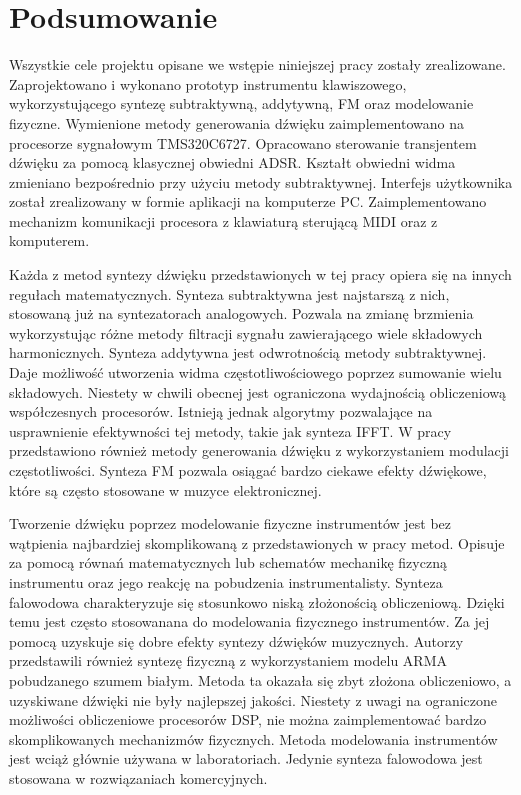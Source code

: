 \chapter{Podsumowanie}

Wszystkie cele projektu opisane we wstępie niniejszej pracy zostały zrealizowane. Zaprojektowano i wykonano prototyp instrumentu klawiszowego, wykorzystującego syntezę subtraktywną, addytywną, FM oraz modelowanie fizyczne. Wymienione metody generowania dźwięku zaimplementowano na procesorze sygnałowym TMS320C6727. Opracowano sterowanie transjentem dźwięku za pomocą klasycznej obwiedni ADSR. Kształt obwiedni widma zmieniano bezpośrednio przy użyciu metody subtraktywnej. Interfejs użytkownika został zrealizowany w formie aplikacji na komputerze PC. Zaimplementowano mechanizm komunikacji procesora z klawiaturą sterującą MIDI oraz z komputerem. 

Każda z metod syntezy dźwięku przedstawionych w tej pracy opiera się na innych regułach matematycznych. Synteza subtraktywna jest najstarszą z nich, stosowaną już na syntezatorach analogowych. Pozwala na zmianę brzmienia wykorzystując różne metody filtracji sygnału zawierającego wiele składowych harmonicznych. Synteza addytywna jest odwrotnością metody subtraktywnej. Daje możliwość utworzenia widma częstotliwościowego poprzez sumowanie wielu składowych. Niestety w chwili obecnej jest ograniczona wydajnością obliczeniową współczesnych procesorów. Istnieją jednak algorytmy pozwalające na usprawnienie efektywności tej metody, takie jak synteza IFFT. W pracy przedstawiono również metody generowania dźwięku z wykorzystaniem modulacji częstotliwości. Synteza FM pozwala osiągać bardzo ciekawe efekty dźwiękowe, które są często stosowane w muzyce elektronicznej.

Tworzenie dźwięku poprzez modelowanie fizyczne instrumentów jest bez wątpienia najbardziej skomplikowaną z przedstawionych w pracy metod. Opisuje za pomocą równań matematycznych lub schematów mechanikę fizyczną instrumentu oraz jego reakcję na pobudzenia instrumentalisty.
Synteza falowodowa charakteryzuje się stosunkowo niską złożonością obliczeniową. Dzięki temu jest często stosowanana do modelowania fizycznego instrumentów. Za jej pomocą uzyskuje się dobre efekty syntezy dźwięków muzycznych.
Autorzy przedstawili również syntezę fizyczną z wykorzystaniem modelu ARMA pobudzanego szumem białym. Metoda ta okazała się zbyt złożona obliczeniowo, a uzyskiwane dźwięki nie były najlepszej jakości.
Niestety z uwagi na ograniczone możliwości obliczeniowe procesorów DSP, nie można zaimplementować bardzo skomplikowanych mechanizmów fizycznych. Metoda modelowania instrumentów jest wciąż głównie używana w laboratoriach. Jedynie synteza falowodowa jest stosowana w rozwiązaniach komercyjnych.

